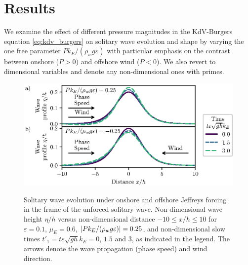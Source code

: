 \documentclass{jfm}
\renewcommand*{\epsilon}{\varepsilon}
\begin{document}
\section{\label{sec:results} Results}
We examine the effect of different pressure magnitudes in the
KdV-Burgers equation \cref{eq:kdv_burgers} on solitary wave evolution
and shape by varying the one free parameter $P k_E/(\rho_w g \epsilon)$
with particular emphasis on the contrast between onshore ($P > 0$) and
offshore wind ($P < 0$).
We also revert to dimensional variables and denote any
non-dimensional ones with primes.

\begin{figure}
  \centering
  { %
    \label{fig:snapshots_solitary:a}
    \label{fig:snapshots_solitary:b}
  }
  \includegraphics{Snapshots-Positive-Negative-Production.eps}
  \caption{
    Solitary wave evolution under
    onshore and
    offshore Jeffreys forcing in the frame of the unforced solitary
    wave.
    Non-dimensional wave height $\eta/h$ versus
    non-dimensional distance $-10 \le x/h \le 10$ for $\epsilon=0.1$,
    $\mu_E = 0.6$, $\abs{P k_E/(\rho_w g \epsilon)} = 0.25$, and
    non-dimensional slow times $t'_1 = t \epsilon \sqrt{gh} k_E = 0$,
    $1.5$ and $3$, as indicated in the legend.
    The arrows denote the wave propagation (phase speed) and wind
    direction.
  }\label{fig:snapshots_solitary}
\end{figure}
\end{document}
